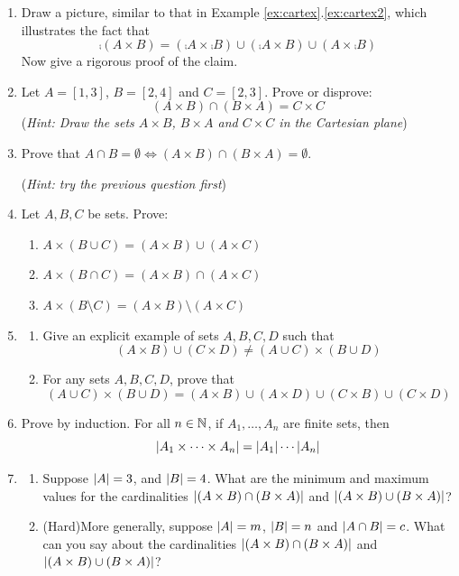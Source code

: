\begin{exercises}{}{}
\begin{enumerate}
		
		\item\label{ex:cartneg} Draw a picture, similar to that in Example \ref*{ex:cartex}.\ref{ex:cartex2}, which illustrates the fact that
		\[
			\comp{(A\times B)} =(\comp A\times\comp B)\cup (\comp A\times B) \cup (A\times\comp B)
		\]
		Now give a rigorous proof of the claim.
		
		
		\item Let $A=[1,3]$, $B=[2,4]$ and $C=[2,3]$. Prove or disprove:
		\[
			(A\times B)\cap (B\times A)=C\times C
		\]
		(\emph{Hint: Draw the sets $A\times B$, $B\times A$ and $C\times C$ in the Cartesian plane})
		
			
		\item Prove that $A\cap B=\emptyset\iff (A\times B)\cap(B\times A)=\emptyset$.\par
		(\emph{Hint: try the previous question first})
		
		
		\item Let $A,B,C$ be sets. Prove:
		\begin{enumerate}
	  	\item $A\times (B\cup C)=(A\times B)\cup (A\times C)$
	    \item $A\times (B\cap C)=(A\times B)\cap (A\times C)$
	    \item $A\times (B\setminus C)=(A\times B)\setminus (A\times C)$
		\end{enumerate}
	
	
		\item\begin{enumerate}
	    \item Give an explicit example of sets $A,B,C,D$ such that
	    \[
	    	(A\times B)\cup (C\times D)\neq (A\cup C) \times (B\cup D)
	    \]
	    \item For any sets $A,B,C,D$, prove that
	    \[
	      (A\cup C)\times (B\cup D)=(A\times B)\cup (A\times D)\cup (C\times B)\cup (C\times D)
	    \]
		\end{enumerate}
		
		
	  \item Prove by induction. For all $n\in\mathbb{N}$, if $A_1,\ldots,A_n$ are finite sets, then
	  \[
	  	\left| A_1\times\cdots\times A_n\right|=\left| A_1\right|\cdots\left| A_n\right|
	  \] 
	
		
	  \item\begin{enumerate}
			\item Suppose $\left| A\right|=3$, and $\left| B\right|=4$. What are the minimum and maximum values for the cardinalities $\left| (A\times B)\cap(B\times A)\right|$ and $\left| (A\times B)\cup(B\times A)\right|$?
			\item (Hard)\lstsp More generally, suppose $\left| A\right|=m$, $\left| B\right|=n$ and $\left| A\cap B\right|=c$. What can you say about the cardinalities $\left| (A\times B)\cap(B\times A)\right|$ and $\left| (A\times B)\cup(B\times A)\right|$?
		\end{enumerate}
		

\end{enumerate}
\end{exercises}
